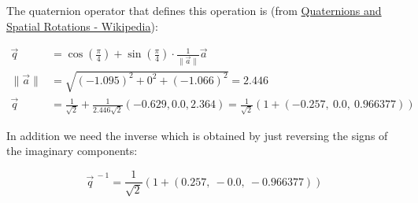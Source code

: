 \documentclass{article}\usepackage[]{graphicx}\usepackage[]{color}
\begin{document}
The quaternion operator that defines this operation is (from \href{https://en.wikipedia.org/wiki/Quaternions_and_spatial_rotation}{Quaternions and Spatial Rotations - Wikipedia}):

\begin{align*}
  \vec{q} &= \cos(\frac{\pi}{4})+\sin(\frac{\pi}{4})\cdot \frac{1}{\| \vec{a} \|}\vec{a}\\
  \| \vec{a} \| &= \sqrt{(-1.095)^2+0^2+(-1.066)^2}=2.446\\
  \vec{q} &= \frac{1}{\sqrt{2}}+\frac{1}{2.446\sqrt{2}}(-0.629,0.0,2.364)=\frac{1}{\sqrt{2}}(1+(-0.257,\ 0.0,\ 0.966377))
\end{align*}

In addition we need the inverse which is obtained by just reversing the signs of the imaginary components:

$$\vec{q}^{\ -1}=\frac{1}{\sqrt{2}}(1+(0.257,\ -0.0,\ -0.966377)) $$
\end{document}

